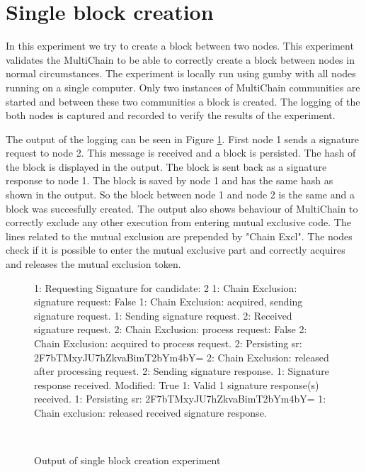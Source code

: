 \section{Single block creation}
In this experiment we try to create a block between two nodes.
This experiment validates the MultiChain to be able to correctly create a block between nodes in normal circumstances.
The experiment is locally run using gumby with all nodes running on a single computer.
Only two instances of MultiChain communities are started and between these two communities a block is created.
The logging of the both nodes is captured and recorded to verify the results of the experiment.

The output of the logging can be seen in Figure \ref{fig:singleblockexperiment}.
First node 1 sends a signature request to node 2.
This message is received and a block is persisted.
The hash of the block is displayed in the output.
The block is sent back as a signature response to node 1.
The block is saved by node 1 and has the same hash as shown in the output.
So the block between node 1 and node 2 is the same and a block was succesfully created.
The output also shows behaviour of MultiChain
to correctly exclude any other execution from entering mutual exclusive code.
The lines related to the mutual exclusion are prepended by "Chain Excl".
The nodes check if it is possible to enter the mutual exclusive part and correctly acquires
and releases the mutual exclusion token.

\begin{figure}
\begin{FVerbatim}[fontsize=\small]
1: Requesting Signature for candidate: 2
1: Chain Exclusion: signature request: False
1: Chain Exclusion: acquired, sending signature request.
1: Sending signature request.
2: Received signature request.
2: Chain Exclusion: process request: False
2: Chain Exclusion: acquired to process request.
2: Persisting sr: 2F7bTMxyJU7hZkvaBimT2bYm4bY=
2: Chain Exclusion: released after processing request.
2: Sending signature response.
1: Signature response received. Modified: True
1: Valid 1 signature response(s) received.
1: Persisting sr: 2F7bTMxyJU7hZkvaBimT2bYm4bY=
1: Chain exclusion: released received signature response.
\end{FVerbatim}
    \caption{Output of single block creation experiment}~\label{fig:singleblockexperiment}
\end{figure}

